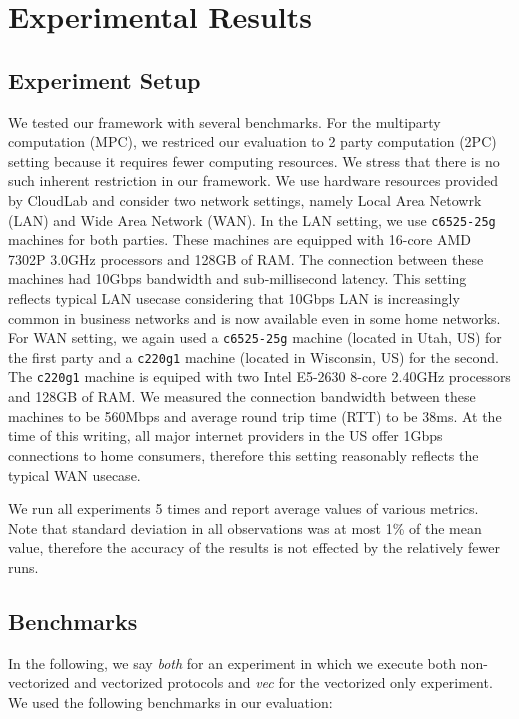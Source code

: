 \section{Experimental Results}
\label{sec:results}

\subsection{Experiment Setup}\label{sec:experiment_setup}
We tested our framework with several benchmarks. For the multiparty computation (MPC), we restriced our evaluation to 2 party computation (2PC) setting because it requires fewer computing resources. We stress that there is no such inherent restriction in our framework. We use hardware resources provided by CloudLab\cite{DuplyakinATC19} and consider two network settings, namely Local Area Netowrk (LAN) and Wide Area Network (WAN). In the LAN setting, we use {\tt c6525-25g} machines for both parties. These machines are equipped with 16-core AMD 7302P 3.0GHz processors and 128GB of RAM. The connection between these machines had 10Gbps bandwidth and sub-millisecond latency. This setting reflects typical LAN usecase considering that 10Gbps LAN is increasingly common in business networks and is now available even in some home networks. For WAN setting, we again used a {\tt c6525-25g} machine (located in Utah, US) for the first party and a {\tt c220g1} machine (located in Wisconsin, US) for the second. The {\tt c220g1} machine is equiped with two Intel E5-2630 8-core 2.40GHz processors and 128GB of RAM. We measured the connection bandwidth between these machines to be 560Mbps and average round trip time (RTT) to be 38ms. At the time of this writing, all major internet providers in the US offer 1Gbps connections to home consumers, therefore this setting reasonably reflects the typical WAN usecase.

We run all experiments 5 times and report average values of various metrics. Note that standard deviation in all observations was at most 1\% of the mean value, therefore the accuracy of the results is not effected by the relatively fewer runs.

\subsection{Benchmarks}\label{sec:benchmarks_description}
In the following, we say {\em both} for an experiment in which we execute both non-vectorized and vectorized protocols and {\em vec} for the vectorized only experiment. We used the following benchmarks in our evaluation:


